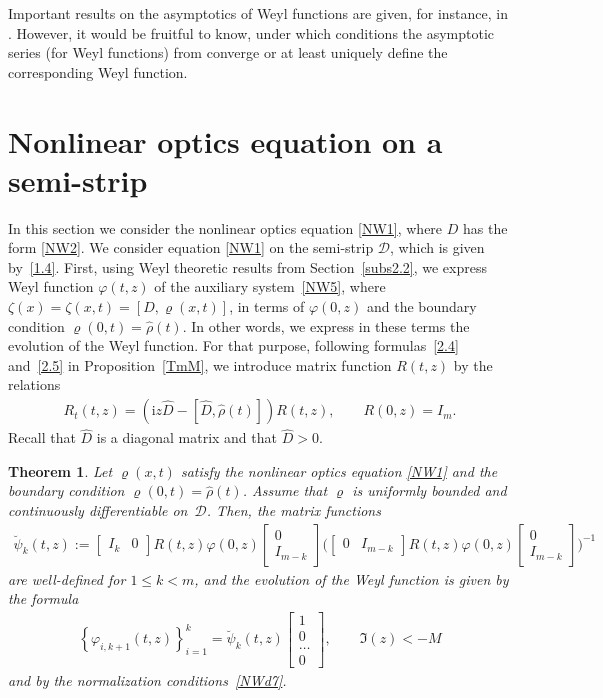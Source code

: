 \documentclass[pdftex]{sigma}
\newtheorem{Theorem}{Theorem}[section]
\def\vr{\varrho}
\def\vp{\varphi}
\def\wh{\widehat}
\newcommand{\I}{\mathrm{i}}
\newcommand{\cD}{{\mathcal D}}
\numberwithin{equation}{section}
\begin{document}
Important results on the asymptotics of Weyl functions
are given, for instance, in \cite{ClGe, Harr}. However, it would be fruitful to know, under which conditions the asymptotic series (for Weyl functions)
from \cite{ClGe, Harr} converge or at least uniquely def\/ine the corresponding Weyl function.

\section{Nonlinear optics equation on a semi-strip} \label{NW}

In this section we consider the nonlinear optics equation \eqref{NW1}, where $D$ has the form \eqref{NW2}.
We consider equation \eqref{NW1} on the semi-strip $\cD$, which is given by~\eqref{1.4}. First, using Weyl theoretic
results from Section~\ref{subs2.2}, we express Weyl function $\vp(t,z)$ of the auxiliary system~\eqref{NW5},
where $\zeta(x)=\zeta(x,t)=[D,\vr(x,t)]$, in terms of $\vp(0,z)$ and
the boundary condition $\vr(0,t)=\wh \rho(t)$. In other words, we express in these terms the evolution of the Weyl function.
For that purpose, following formulas~\eqref{2.4} and~\eqref{2.5} in Proposition~\ref{TmM},
we introduce matrix function $R(t,z)$ by the relations
\begin{gather} \label{NW20}
R_t(t,z)=(\I z \wh D-[\wh D,\wh \rho(t)])R(t,z), \qquad R(0,z)=I_m.
\end{gather}
Recall that $\wh D$ is a diagonal matrix and that $\wh D>0$.
\begin{Theorem}
\label{TmNWevol}
Let $\vr(x,t)$ satisfy the nonlinear optics equation \eqref{NW1} and the boundary condition $\vr(0,t)=\wh \rho(t)$.
Assume that $\vr$ is uniformly bounded and continuously differentiable on~$\cD$.
Then, the matrix functions
\begin{gather} \label{NW21}
\breve \psi_k(t,z):=
 \begin{bmatrix} I_k & 0\end{bmatrix}
R(t,z) \varphi (0,z)
 \left[
  \begin{matrix}
    0  \\
    I_{m-k}
  \end{matrix}
 \right]
 \biggl(
 \begin{bmatrix} 0 & I_{m-k}\end{bmatrix}
  R(t,z) \varphi (0,z)
  \left[
  \begin{matrix}
    0  \\
    I_{m-k}
  \end{matrix}
  \right]
 \biggr)^{-1}
\end{gather}
are well-defined for $1\leq k <m$, and the evolution of the Weyl function is given by the formula
\begin{gather} \label{NW22}
  \left\{
   \varphi_{i, k+1}(t,z)
  \right\}_{i=1}^k
 = \breve \psi_k (t,z)\begin{bmatrix} 1\\ 0 \\ \ldots \\0
 \end{bmatrix}, \qquad \Im(z)<-M
\end{gather}
and by the normalization conditions~\eqref{NWd7}.
\end{Theorem}
\end{document}
